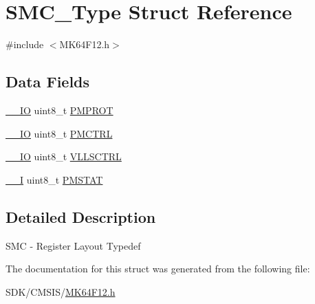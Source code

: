 \hypertarget{struct_s_m_c___type}{}\section{S\+M\+C\+\_\+\+Type Struct Reference}
\label{struct_s_m_c___type}


{\ttfamily \#include $<$M\+K64\+F12.\+h$>$}

\subsection*{Data Fields}
\begin{DoxyCompactItemize}
\item 
\mbox{\hyperlink{core__cm4_8h_aec43007d9998a0a0e01faede4133d6be}{\+\_\+\+\_\+\+IO}} uint8\+\_\+t \mbox{\hyperlink{group___v_r_e_f___peripheral___access___layer_gab80b0e0bb4c1aa3e20de93cee5828603}{P\+M\+P\+R\+OT}}
\item 
\mbox{\hyperlink{core__cm4_8h_aec43007d9998a0a0e01faede4133d6be}{\+\_\+\+\_\+\+IO}} uint8\+\_\+t \mbox{\hyperlink{group___v_r_e_f___peripheral___access___layer_ga96fa5644eba54c5bf0a4c5c16ad4f6f7}{P\+M\+C\+T\+RL}}
\item 
\mbox{\hyperlink{core__cm4_8h_aec43007d9998a0a0e01faede4133d6be}{\+\_\+\+\_\+\+IO}} uint8\+\_\+t \mbox{\hyperlink{group___v_r_e_f___peripheral___access___layer_ga813a3036c963ab3498eca297988777f8}{V\+L\+L\+S\+C\+T\+RL}}
\item 
\mbox{\hyperlink{core__cm4_8h_af63697ed9952cc71e1225efe205f6cd3}{\+\_\+\+\_\+I}} uint8\+\_\+t \mbox{\hyperlink{group___v_r_e_f___peripheral___access___layer_gad38d8d9691e23bb395d7b9030040693a}{P\+M\+S\+T\+AT}}
\end{DoxyCompactItemize}


\subsection{Detailed Description}
S\+MC -\/ Register Layout Typedef 

The documentation for this struct was generated from the following file\+:\begin{DoxyCompactItemize}
\item 
S\+D\+K/\+C\+M\+S\+I\+S/\mbox{\hyperlink{_m_k64_f12_8h}{M\+K64\+F12.\+h}}\end{DoxyCompactItemize}
